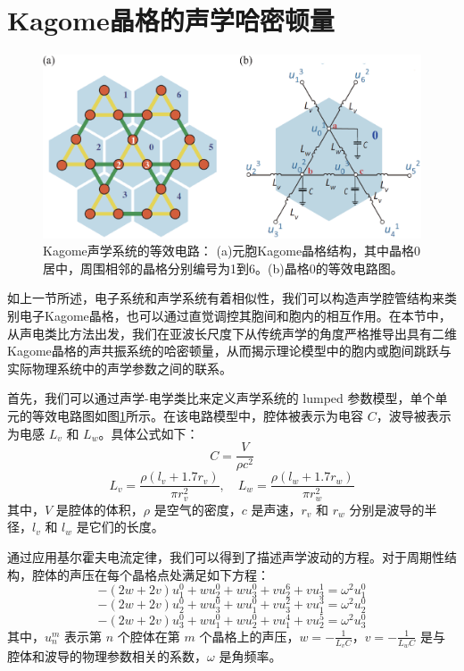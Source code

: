 \section{Kagome晶格的声学哈密顿量}

\begin{figure}[h!]
  \centering
  \includegraphics[width=1\textwidth]{images/fig3-2.eps} 
  \caption{Kagome声学系统的等效电路：
  (a)元胞Kagome晶格结构，其中晶格0居中，周围相邻的晶格分别编号为1到6。(b)晶格0的等效电路图。
  }
  \label{fig_3_2}
\end{figure}

如上一节所述，电子系统和声学系统有着相似性，我们可以构造声学腔管结构来类别电子Kagome晶格，也可以通过直觉调控其胞间和胞内的相互作用。在本节中，从声电类比方法出发，我们在亚波长尺度下从传统声学的角度严格推导出具有二维Kagome晶格的声共振系统的哈密顿量，从而揭示理论模型中的胞内或胞间跳跃与实际物理系统中的声学参数之间的联系。

首先，我们可以通过声学-电学类比来定义声学系统的 lumped 参数模型，单个单元的等效电路图如图\ref{fig_3_2}所示。在该电路模型中，腔体被表示为电容 \( C \)，波导被表示为电感 \( L_v \) 和 \( L_w \)。具体公式如下：
\[
C = \frac{V}{\rho c^2}
\]
\[
L_v = \frac{\rho (l_v + 1.7r_v)}{\pi r_v^2}, \quad L_w = \frac{\rho (l_w + 1.7r_w)}{\pi r_w^2}
\]
其中，\( V \) 是腔体的体积，\( \rho \) 是空气的密度，\( c \) 是声速，\( r_v \) 和 \( r_w \) 分别是波导的半径，\( l_v \) 和 \( l_w \) 是它们的长度。


通过应用基尔霍夫电流定律，我们可以得到了描述声学波动的方程。对于周期性结构，腔体的声压在每个晶格点处满足如下方程：
\[
- (2w + 2v) u_1^0 + w u_2^0 + w u_3^0 + v u_2^6 + v u_3^1 = \omega^2 u_1^0
\]
\[
- (2w + 2v) u_2^0 + w u_3^0 + w u_1^0 + v u_3^2 + v u_1^3 = \omega^2 u_2^0
\]
\[
- (2w + 2v) u_3^0 + w u_1^0 + w u_2^0 + v u_1^4 + v u_2^5 = \omega^2 u_3^0
\]
其中，\( u_n^m \) 表示第 \( n \) 个腔体在第 \( m \) 个晶格上的声压，\( w = -\frac{1}{L_v C} \)，\( v = -\frac{1}{L_w C} \) 是与腔体和波导的物理参数相关的系数，\( \omega \) 是角频率。


